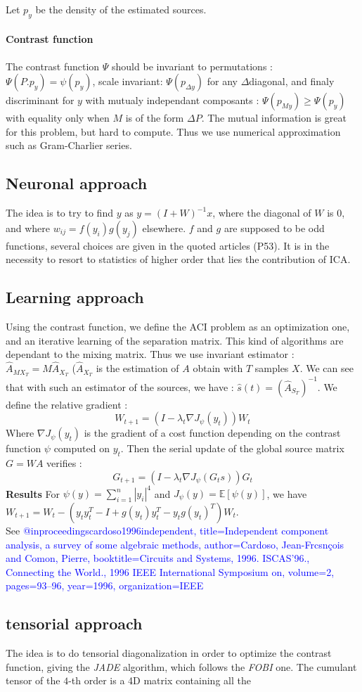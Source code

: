 \documentclass[a4paper,11pt,titlepage]{article}
\begin{document}
Let $p_y$ be the density of the estimated sources.
\paragraph{Contrast function} The contrast function $\Psi$ should be invariant to permutations : $\Psi(P.p_y) = \psi(p_y)$, scale invariant: $\Psi(p_{\Delta y})$ for any $\Delta$diagonal, and finaly discriminant for $y$ with mutualy independant composants : $\Psi(p_{My}) \geq \Psi(p_y)$ with equality only when $M$ is of the form $\Delta P$.
The mutual information is great for this problem, but hard to compute. Thus we use numerical approximation such as Gram-Charlier series.

\subsection{Neuronal approach}
The idea is to try to find $y$ as $y = (I+W)^{-1}x$, where the diagonal of $W$ is 0, and where $w_{ij} = f(y_i)g(y_j)$ elsewhere. $f$ and $g$ are supposed to be odd functions, several choices are given in the quoted articles (P53).
It is in the necessity to resort to statistics of higher order that lies the contribution of ICA.

\subsection{Learning approach}
Using the contrast function, we define the ACI problem as an optimization one, and an iterative learning of the separation matrix. This kind of algorithms are dependant to the mixing matrix. Thus we use invariant estimator : $\hat{A}_{MX_T}=M\hat{A}_{X_T}$ ($\hat{A}_{X_T}$ is the estimation of $A$ obtain with $T$ samples $X$. We can see that with such an estimator of the sources, we have : $\hat{s}(t) = (\hat{A}_{S_T})^{-1}$.
We define the relative gradient :
\begin{equation*}
	W_{t+1} = (I - \lambda_t\nabla J_\psi(y_t))W_t
\end{equation*}
Where $\nabla J_\psi(y_t)$ is the gradient of a cost function depending on the contrast function $\psi$ computed on $y_t$. Then the serial update of the global source matrix $G =WA$ verifies :
\begin{equation*}
	G_{t+1} = (I - \lambda_t\nabla J_\psi(G_ts))G_t
\end{equation*}
\textbf{Results} For $\psi(y) = \sum\limits_{i=1}^n |y_i|^4$ and $J_\psi(y) = \mathds{E}[\psi(y)]$, we have $W_{t+1} = W_t -(y_t y_t^T-I+g(y_t)y_t^T- y_t g(y_t)^T)W_t$. \\
See \textcolor{blue}{@inproceedings{cardoso1996independent,
	  title={Independent component analysis, a survey of some algebraic methods},
	    author={Cardoso, Jean-Frcsn{\c{c}}ois and Comon, Pierre},
		  booktitle={Circuits and Systems, 1996. ISCAS'96., Connecting the World., 1996 IEEE International Symposium on},
		    volume={2},
			  pages={93--96},
			    year={1996},
				  organization={IEEE}
			  }
}

\subsection{tensorial approach}
The idea is to do tensorial diagonalization in order to optimize the contrast function, giving the \textit{JADE} algorithm, which follows the \textit{FOBI} one. The cumulant tensor of the $4$-th order is a 4D matrix containing all the 
\end{document}
